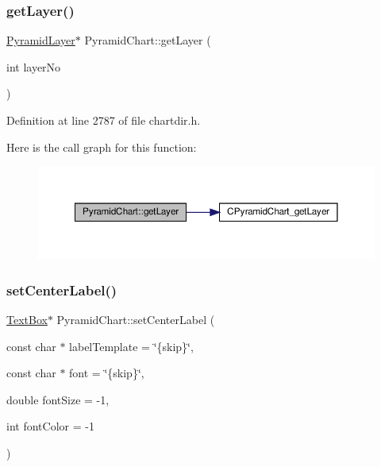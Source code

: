 \subsubsection{\texorpdfstring{get\+Layer()}{getLayer()}}
{\footnotesize\ttfamily \hyperlink{class_pyramid_layer}{Pyramid\+Layer}$\ast$ Pyramid\+Chart\+::get\+Layer (\begin{DoxyParamCaption}\item[{int}]{layer\+No }\end{DoxyParamCaption})\hspace{0.3cm}{\ttfamily [inline]}}



Definition at line 2787 of file chartdir.\+h.

Here is the call graph for this function\+:
\nopagebreak
\begin{figure}[H]
\begin{center}
\leavevmode
\includegraphics[width=350pt]{class_pyramid_chart_abfcc75e4f7e3f2403701d1c824d85ffe_cgraph}
\end{center}
\end{figure}
\mbox{\label{class_pyramid_chart_a90421ce47f83d9ae8ef001196e0d1712}} 
\subsubsection{\texorpdfstring{set\+Center\+Label()}{setCenterLabel()}}
{\footnotesize\ttfamily \hyperlink{class_text_box}{Text\+Box}$\ast$ Pyramid\+Chart\+::set\+Center\+Label (\begin{DoxyParamCaption}\item[{const char $\ast$}]{label\+Template = {\ttfamily \char`\"{}\{skip\}\char`\"{}},  }\item[{const char $\ast$}]{font = {\ttfamily \char`\"{}\{skip\}\char`\"{}},  }\item[{double}]{font\+Size = {\ttfamily -\/1},  }\item[{int}]{font\+Color = {\ttfamily -\/1} }\end{DoxyParamCaption})\hspace{0.3cm}{\ttfamily [inline]}}



